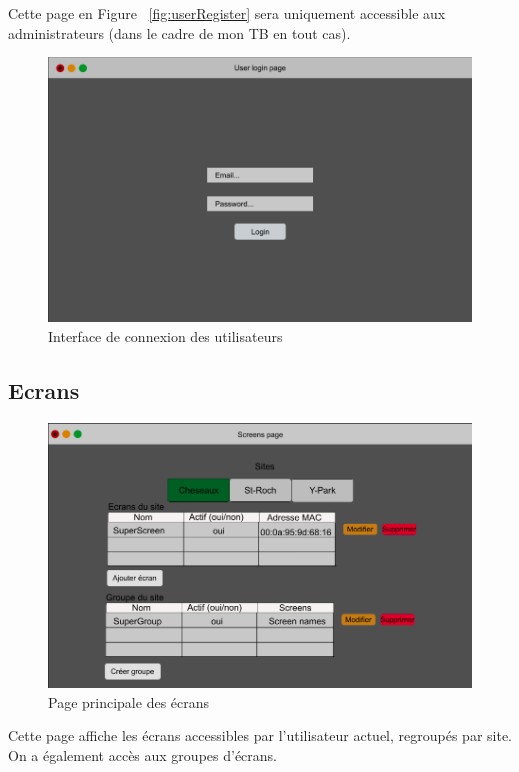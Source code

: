 \documentclass[french]{article}
\begin{document}
	Cette page en Figure ~\ref{fig:userRegister} sera uniquement accessible aux administrateurs (dans le cadre de mon TB en tout cas).
	
	\begin{figure}[h!]
		\centering
		\includegraphics[scale=0.4]{mockup/m_user_login}
		\caption{Interface de connexion des utilisateurs}
		\label{fig:userLogin}
	\end{figure}
	
\newpage
\subsection{Ecrans}
	
	\begin{figure}[h]
		\centering
		\includegraphics[scale=0.4]{mockup/m_screens_page}
		\caption{Page principale des écrans}
		\label{fig:screenPage}
	\end{figure}
	
	Cette page affiche les écrans accessibles par l'utilisateur actuel, regroupés par site. On a également accès aux groupes d'écrans. 
	
\end{document}
